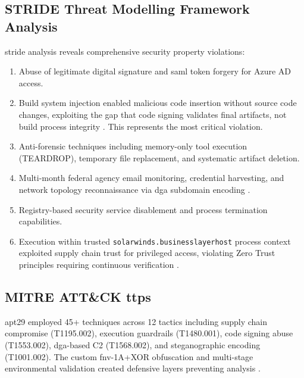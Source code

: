 \subsection{STRIDE Threat Modelling Framework Analysis}

\gls{stride} analysis \cite{kohnfelder1999} reveals comprehensive security property violations:

\begin{enumerate}
    \item {} Abuse of legitimate digital signature and \gls{saml} token forgery for Azure AD access.
    \item {} Build system injection enabled malicious code insertion without source code changes, exploiting the gap that code signing validates final artifacts, not build process integrity \cite{eckels2020}. This represents the most critical violation.
    \item {} Anti-forensic techniques including memory-only tool execution (TEARDROP), temporary file replacement, and systematic artifact deletion.
    \item {} Multi-month federal agency email monitoring, credential harvesting, and network topology reconnaissance via \gls{dga} subdomain encoding \cite{openhearing2021}.
    \item {} Registry-based security service disablement and process termination capabilities.
    \item {} Execution within trusted \texttt{solarwinds.businesslayerhost} process context exploited supply chain trust for privileged access, violating Zero Trust principles requiring continuous verification \cite{rose2020}.
\end{enumerate}

\subsection{MITRE ATT\&CK \gls{ttp}s}
\gls{apt}29 employed 45+ techniques across 12 tactics \cite{mitre2025a, mitre2025b} including supply chain compromise (T1195.002), execution guardrails (T1480.001), code signing abuse (T1553.002), \gls{dga}-based C2 (T1568.002), and steganographic encoding (T1001.002). The custom \gls{fnv}-1A+XOR obfuscation and multi-stage environmental validation created defensive layers preventing analysis \cite{eckels2020, fireeye2020}.

